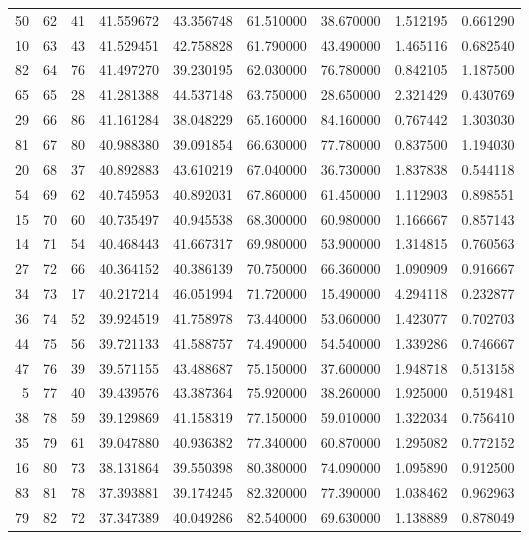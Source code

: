 \begin{tabular}{rrrrrrrrr}
50 & 62 & 41 & 41.559672 & 43.356748 & 61.510000 & 38.670000 & 1.512195 & 0.661290 \\
10 & 63 & 43 & 41.529451 & 42.758828 & 61.790000 & 43.490000 & 1.465116 & 0.682540 \\
82 & 64 & 76 & 41.497270 & 39.230195 & 62.030000 & 76.780000 & 0.842105 & 1.187500 \\
65 & 65 & 28 & 41.281388 & 44.537148 & 63.750000 & 28.650000 & 2.321429 & 0.430769 \\
29 & 66 & 86 & 41.161284 & 38.048229 & 65.160000 & 84.160000 & 0.767442 & 1.303030 \\
81 & 67 & 80 & 40.988380 & 39.091854 & 66.630000 & 77.780000 & 0.837500 & 1.194030 \\
20 & 68 & 37 & 40.892883 & 43.610219 & 67.040000 & 36.730000 & 1.837838 & 0.544118 \\
54 & 69 & 62 & 40.745953 & 40.892031 & 67.860000 & 61.450000 & 1.112903 & 0.898551 \\
15 & 70 & 60 & 40.735497 & 40.945538 & 68.300000 & 60.980000 & 1.166667 & 0.857143 \\
14 & 71 & 54 & 40.468443 & 41.667317 & 69.980000 & 53.900000 & 1.314815 & 0.760563 \\
27 & 72 & 66 & 40.364152 & 40.386139 & 70.750000 & 66.360000 & 1.090909 & 0.916667 \\
34 & 73 & 17 & 40.217214 & 46.051994 & 71.720000 & 15.490000 & 4.294118 & 0.232877 \\
36 & 74 & 52 & 39.924519 & 41.758978 & 73.440000 & 53.060000 & 1.423077 & 0.702703 \\
44 & 75 & 56 & 39.721133 & 41.588757 & 74.490000 & 54.540000 & 1.339286 & 0.746667 \\
47 & 76 & 39 & 39.571155 & 43.488687 & 75.150000 & 37.600000 & 1.948718 & 0.513158 \\
5 & 77 & 40 & 39.439576 & 43.387364 & 75.920000 & 38.260000 & 1.925000 & 0.519481 \\
38 & 78 & 59 & 39.129869 & 41.158319 & 77.150000 & 59.010000 & 1.322034 & 0.756410 \\
35 & 79 & 61 & 39.047880 & 40.936382 & 77.340000 & 60.870000 & 1.295082 & 0.772152 \\
16 & 80 & 73 & 38.131864 & 39.550398 & 80.380000 & 74.090000 & 1.095890 & 0.912500 \\
83 & 81 & 78 & 37.393881 & 39.174245 & 82.320000 & 77.390000 & 1.038462 & 0.962963 \\
79 & 82 & 72 & 37.347389 & 40.049286 & 82.540000 & 69.630000 & 1.138889 & 0.878049 \\

\end{tabular}
